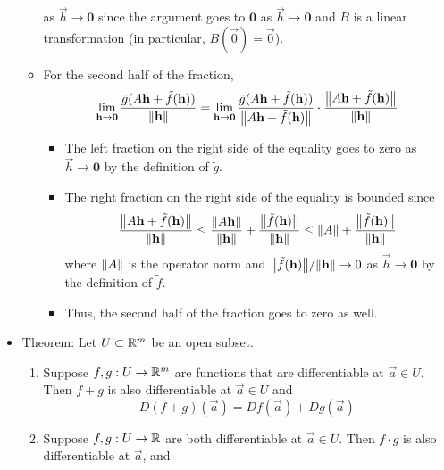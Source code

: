 \documentclass[../notes.tex]{subfiles}
\begin{document}
\begin{itemize}
\begin{itemize}
\begin{equation*}
        \end{equation*}
        as $\vec{h}\to\bm{0}$ since the argument goes to $\bm{0}$ as $\vec{h}\to\bm{0}$ and $B$ is a linear transformation (in particular, $B(\vec{0})=\vec{0}$).
        \item For the second half of the fraction,
        \begin{equation*}
            \lim_{\mathbf{h}\to\bm{0}}\frac{\tilde{g}(A\mathbf{h}+\tilde{f}(\mathbf{h}))}{\norm{\mathbf{h}}} = \lim_{\mathbf{h}\to\bm{0}}\frac{\tilde{g}(A\mathbf{h}+\tilde{f}(\mathbf{h}))}{\norm{A\mathbf{h}+\tilde{f}(\mathbf{h})}}\cdot\frac{\norm{A\mathbf{h}+\tilde{f}(\mathbf{h})}}{\norm{\mathbf{h}}}
        \end{equation*}
        \begin{itemize}
            \item The left fraction on the right side of the equality goes to zero as $\vec{h}\to\bm{0}$ by the definition of $\tilde{g}$.
            \item The right fraction on the right side of the equality is bounded since
            \begin{equation*}
                \frac{\norm{A\mathbf{h}+\tilde{f}(\mathbf{h})}}{\norm{\mathbf{h}}} \leq \frac{\norm{A\mathbf{h}}}{\norm{\mathbf{h}}}+\frac{\norm{\tilde{f}(\mathbf{h})}}{\norm{\mathbf{h}}}
                \leq \norm{A}+\frac{\norm{\tilde{f}(\mathbf{h})}}{\norm{\mathbf{h}}}
            \end{equation*}
            where $\norm{A}$ is the operator norm and $\norm{\tilde{f}(\mathbf{h})}/\norm{\mathbf{h}}\to 0$ as $\vec{h}\to\bm{0}$ by the definition of $\tilde{f}$.
            \item Thus, the second half of the fraction goes to zero as well.
        \end{itemize}
    \end{itemize}
    \item Theorem: Let $U\subset\mathbb{R}^m$ be an open subset.
    \begin{enumerate}
        \item Suppose $f,g:U\to\mathbb{R}^m$ are functions that are differentiable at $\vec{a}\in U$. Then $f+g$ is also differentiable at $\vec{a}\in U$ and
        \begin{equation*}
            D(f+g)(\vec{a}) = Df(\vec{a})+Dg(\vec{a})
        \end{equation*}
        \item Suppose $f,g:U\to\mathbb{R}$ are both differentiable at $\vec{a}\in U$. Then $f\cdot g$ is also differentiable at $\vec{a}$, and
        \begin{equation*}

\end{equation*}
\end{enumerate}
\end{itemize}
\end{document}
